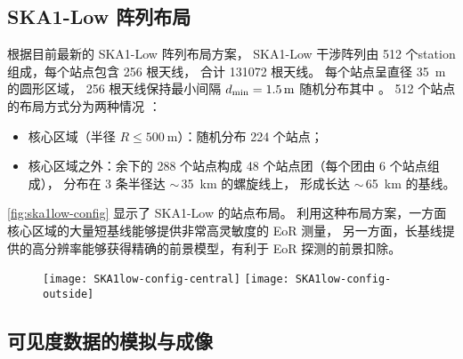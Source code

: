 \subsection{SKA1-Low 阵列布局}

根据目前最新的 SKA1-Low 阵列布局方案，
SKA1-Low 干涉阵列由 512 个\ac{station}组成，每个站点包含 256 根天线，
合计 \num{131072} 根天线。
每个站点呈直径 \SI{35}{\meter} 的圆形区域，
256 根天线保持最小间隔 $d_{\mathrm{min}} = \SI{1.5}{\meter}$
随机分布其中 \cite{mort2017}。
512 个站点的布局方式分为两种情况 \cite{dewdney2016ska}：
\begin{itemize}
  \item 核心区域（半径 $R \le \SI{500}{\meter}$）：随机分布 224 个站点；
  \item 核心区域之外：余下的 288 个站点构成 48 个站点团（每个团由 6 个站点组成），
    分布在 3 条半径达 $\sim$\,\SI{35}{\km} 的螺旋线上，
    形成长达 $\sim$\,\SI{65}{\km} 的基线。
\end{itemize}
\autoref{fig:ska1low-config} 显示了 SKA1-Low 的站点布局。
利用这种布局方案，一方面核心区域的大量短基线能够提供非常高灵敏度的 EoR 测量，
另一方面，长基线提供的高分辨率能够获得精确的前景模型，有利于 EoR 探测的前景扣除。

\begin{figure}[htp]
  \centering
  \texttt{[image: SKA1low-config-central]}%
  \hfill%
  \texttt{[image: SKA1low-config-outside]}
  \label{fig:ska1low-config}
\end{figure}

\subsection{可见度数据的模拟与成像}

